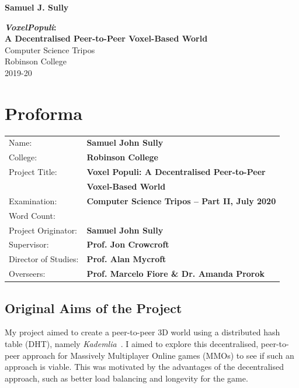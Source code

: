 \documentclass[10pt,twoside,notitlepage,a4paper]{report}
\newcommand{\kademlia}{\emph{Kademlia}}
\newcommand{\voxpop}{\emph{VoxelPopuli}}
\begin{document}
	
	
	
	\pagestyle{empty}
	
	\hfill{\LARGE \bf Samuel J. Sully}
	
	\vspace*{60mm}
	\begin{center}
		\Huge
		{\bf \voxpop:\\ A Decentralised Peer-to-Peer Voxel-Based World} \\
		\vspace*{5mm}
		Computer Science Tripos \\
		\vspace*{5mm}
		Robinson College \\
		\vspace*{5mm}
		2019-20
	\end{center}
	
	\cleardoublepage
	
	\setcounter{page}{1}
	\pagestyle{plain}
	
	\chapter*{Proforma}
	
	{\large
		\begin{tabular}{ll}
			Name:               & \bf Samuel John Sully\\
			College:            & \bf Robinson College\\
			Project Title:      & \bf Voxel Populi: A Decentralised Peer-to-Peer\\ 
								& \bf Voxel-Based World\\
			Examination:        & \bf Computer Science Tripos -- Part II, July 2020\\
			Word Count:         & \bf \footnotemark[1]\\
			Project Originator: & \bf Samuel John Sully\\
			Supervisor:         & \bf Prof. Jon Crowcroft\\
			Director of Studies:& \bf Prof. Alan Mycroft\\
			Overseers:          & \bf Prof. Marcelo Fiore \& Dr. Amanda Prorok 
		\end{tabular}
	}
	
	\section*{Original Aims of the Project}
	My project aimed to create a peer-to-peer 3D world using a distributed hash table (DHT), namely \kademlia{}~\cite{kademlia}. I aimed to explore this decentralised, peer-to-peer approach for Massively Multiplayer Online games (MMOs) to see if such an approach is viable. This was motivated by the advantages of the decentralised approach, such as better load balancing and longevity for the game.
	
\end{document}
